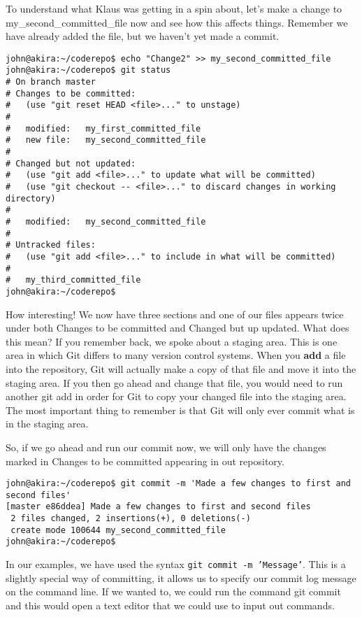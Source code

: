 To understand what Klaus was getting in a spin about, let's make a change to my\_second\_committed\_file now and see how this affects things.  Remember we have already added the file, but we haven't yet made a commit.

\begin{verbatim} 
john@akira:~/coderepo$ echo "Change2" >> my_second_committed_file 
john@akira:~/coderepo$ git status
# On branch master
# Changes to be committed:
#   (use "git reset HEAD <file>..." to unstage)
#
#	modified:   my_first_committed_file
#	new file:   my_second_committed_file
#
# Changed but not updated:
#   (use "git add <file>..." to update what will be committed)
#   (use "git checkout -- <file>..." to discard changes in working directory)
#
#	modified:   my_second_committed_file
#
# Untracked files:
#   (use "git add <file>..." to include in what will be committed)
#
#	my_third_committed_file
john@akira:~/coderepo$ 
\end{verbatim} 

How interesting!  We now have three sections and one of our files appears twice under both Changes to be committed and Changed but up updated.  What does this mean?  If you remember back, we spoke about a staging area.  This is one area in which Git differs to many version control systems.  When you \textbf{add} a file into the repository, Git will actually make a copy of that file and move it into the staging area.  If you then go ahead and change that file, you would need to run another git add in order for Git to copy your changed file into the staging area.  The most important thing to remember is that Git will only ever commit what is in the staging area.

So, if we go ahead and run our commit now, we will only have the changes marked in Changes to be committed appearing in out repository.  

\begin{verbatim} 
john@akira:~/coderepo$ git commit -m 'Made a few changes to first and second files'
[master e86ddea] Made a few changes to first and second files
 2 files changed, 2 insertions(+), 0 deletions(-)
 create mode 100644 my_second_committed_file
john@akira:~/coderepo$ 
\end{verbatim} 

In our examples, we have used the syntax \texttt{git commit -m 'Message'}.  This is a slightly special way of committing, it allows us to specify our commit log message on the command line.  If we wanted to, we could run the command git commit and this would open a text editor that we could use to input out commands.

